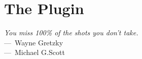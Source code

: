 
\chapter{The \toolname{} Plugin}
\label{ch:Tool}

\begin{epigraph}
  \emph{
    You miss 100\% of the shots you don't take. \\
  } ---~Wayne Gretzky  \\ ---~Michael G.Scott
\end{epigraph}

\endinput
